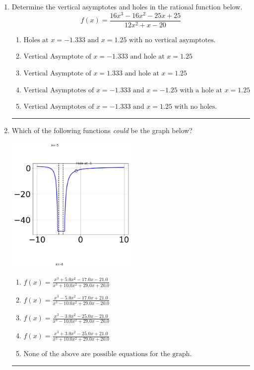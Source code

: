 \documentclass[14pt]{extbook}
\newcommand{\litem}[1]{\item#1\hspace*{-1cm}\rule{\textwidth}{0.4pt}}
\begin{document}
\begin{enumerate}
{\begin{enumerate}[label=\Alph*.]
\end{enumerate} }
\litem{
Determine the vertical asymptotes and holes in the rational function below.\[ f(x) = \frac{16x^{3} -16 x^{2} -25 x + 25}{12x^{2} +x -20} \]\begin{enumerate}[label=\Alph*.]
\item \( \text{Holes at } x = -1.333 \text{ and } x = 1.25 \text{ with no vertical asymptotes.} \)
\item \( \text{Vertical Asymptote of } x = -1.333 \text{ and hole at } x = 1.25 \)
\item \( \text{Vertical Asymptote of } x = 1.333 \text{ and hole at } x = 1.25 \)
\item \( \text{Vertical Asymptotes of } x = -1.333 \text{ and } x = -1.25 \text{ with a hole at } x = 1.25 \)
\item \( \text{Vertical Asymptotes of } x = -1.333 \text{ and } x = 1.25 \text{ with no holes.} \)

\end{enumerate} }
\litem{
Which of the following functions \textit{could} be the graph below?
\begin{center}
    \includegraphics[width=0.5\textwidth]{../Figures/identifyGraphOfRationalFunctionCopyB.png}
\end{center}
\begin{enumerate}[label=\Alph*.]
\item \( f(x)=\frac{x^{3} +5.0 x^{2} -17.0 x -21.0}{x^{3} +10.0 x^{2} +29.0 x + 20.0} \)
\item \( f(x)=\frac{x^{3} -5.0 x^{2} -17.0 x + 21.0}{x^{3} -10.0 x^{2} +29.0 x -20.0} \)
\item \( f(x)=\frac{x^{3} -3.0 x^{2} -25.0 x -21.0}{x^{3} -10.0 x^{2} +29.0 x -20.0} \)
\item \( f(x)=\frac{x^{3} +3.0 x^{2} -25.0 x + 21.0}{x^{3} +10.0 x^{2} +29.0 x + 20.0} \)
\item \( \text{None of the above are possible equations for the graph.} \)


\end{enumerate}}
\end{enumerate}
\end{document}
